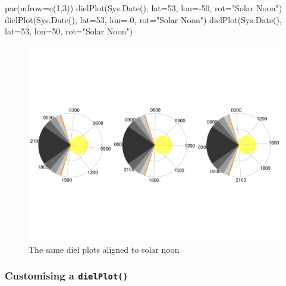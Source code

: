 \documentclass[
]{book}
\newenvironment{Shaded}{\begin{snugshade}}{\end{snugshade}}
\newcommand{\AttributeTok}[1]{\textcolor[rgb]{0.77,0.63,0.00}{#1}}
\newcommand{\DecValTok}[1]{\textcolor[rgb]{0.00,0.00,0.81}{#1}}
\newcommand{\FunctionTok}[1]{\textcolor[rgb]{0.00,0.00,0.00}{#1}}
\newcommand{\NormalTok}[1]{#1}
\newcommand{\SpecialCharTok}[1]{\textcolor[rgb]{0.00,0.00,0.00}{#1}}
\newcommand{\StringTok}[1]{\textcolor[rgb]{0.31,0.60,0.02}{#1}}
\begin{document}
\begin{Shaded}
\begin{Highlighting}[]
\FunctionTok{par}\NormalTok{(}\AttributeTok{mfrow=}\FunctionTok{c}\NormalTok{(}\DecValTok{1}\NormalTok{,}\DecValTok{3}\NormalTok{))}
\FunctionTok{dielPlot}\NormalTok{(}\FunctionTok{Sys.Date}\NormalTok{(), }\AttributeTok{lat=}\DecValTok{53}\NormalTok{, }\AttributeTok{lon=}\SpecialCharTok{{-}}\DecValTok{50}\NormalTok{, }\AttributeTok{rot=}\StringTok{"Solar Noon"}\NormalTok{)}
\FunctionTok{dielPlot}\NormalTok{(}\FunctionTok{Sys.Date}\NormalTok{(), }\AttributeTok{lat=}\DecValTok{53}\NormalTok{, }\AttributeTok{lon=}\SpecialCharTok{{-}}\DecValTok{0}\NormalTok{, }\AttributeTok{rot=}\StringTok{"Solar Noon"}\NormalTok{)}
\FunctionTok{dielPlot}\NormalTok{(}\FunctionTok{Sys.Date}\NormalTok{(), }\AttributeTok{lat=}\DecValTok{53}\NormalTok{, }\AttributeTok{lon=}\DecValTok{50}\NormalTok{, }\AttributeTok{rot=}\StringTok{"Solar Noon"}\NormalTok{)}
\end{Highlighting}
\end{Shaded}

\begin{figure}

{\centering \includegraphics[width=0.9\linewidth]{_main_files/figure-latex/diel-plot-sn-1} 

}

\caption{The same diel plots aligned to solar noon}\label{fig:diel-plot-sn}
\end{figure}

\hypertarget{customising-a-dielplot}{%
\subsubsection{\texorpdfstring{Customising a \texttt{dielPlot()}}{Customising a dielPlot()}}\label{customising-a-dielplot}}
\end{document}
